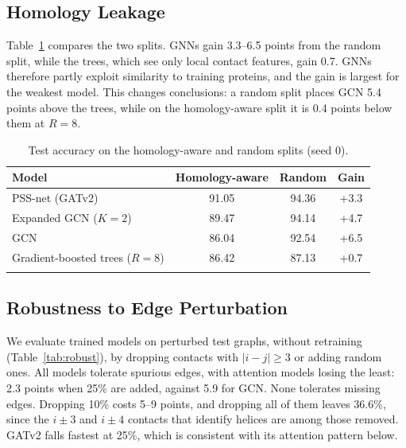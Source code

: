 \documentclass[pdflatex,sn-mathphys-num]{sn-jnl}
\begin{document}
\subsection{Homology Leakage}

Table~\ref{tab:leak} compares the two splits. GNNs gain 3.3--6.5 points from the random split, while the trees, which see only local contact features, gain 0.7. GNNs therefore partly exploit similarity to training proteins, and the gain is largest for the weakest model. This changes conclusions: a random split places GCN 5.4 points above the trees, while on the homology-aware split it is 0.4 points below them at $R=8$.

\begin{table}[t]
\caption{Test accuracy on the homology-aware and random splits (seed 0).}
\label{tab:leak}
\begin{tabular}{lccc}
\toprule
Model & Homology-aware & Random & Gain \\
\midrule
PSS-net (GATv2) & 91.05 & 94.36 & +3.3 \\
Expanded GCN ($K=2$) & 89.47 & 94.14 & +4.7 \\
GCN & 86.04 & 92.54 & +6.5 \\
Gradient-boosted trees ($R=8$) & 86.42 & 87.13 & +0.7 \\
\botrule
\end{tabular}
\end{table}

\subsection{Robustness to Edge Perturbation}

We evaluate trained models on perturbed test graphs, without retraining (Table~\ref{tab:robust}), by dropping contacts with $|i-j| \geq 3$ or adding random ones. All models tolerate spurious edges, with attention models losing the least: 2.3 points when 25\% are added, against 5.9 for GCN. None tolerates missing edges. Dropping 10\% costs 5--9 points, and dropping all of them leaves 36.6\%, since the $i \pm 3$ and $i \pm 4$ contacts that identify helices are among those removed. GATv2 falls fastest at 25\%, which is consistent with its attention pattern below.
\end{document}
